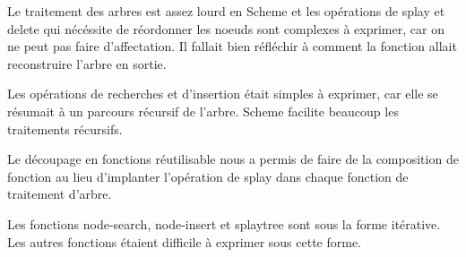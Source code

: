 \documentclass{article}
\begin{document}
  Le traitement des arbres est assez lourd en Scheme et les opérations de splay
  et delete qui nécéssite de réordonner les noeuds sont complexes à exprimer,
  car on ne peut pas faire d'affectation. Il fallait bien réfléchir à comment la
  fonction allait reconstruire l'arbre en sortie.

  Les opérations de recherches et d'insertion était simples à exprimer, car elle
  se résumait à un parcours récursif de l'arbre. Scheme facilite beaucoup les
  traitements récursifs.

  Le découpage en fonctions réutilisable nous a permis de faire de la
  composition de fonction au lieu d'implanter l'opération de splay dans chaque
  fonction de traitement d'arbre.

  Les fonctions \textsf{node-search}, \textsf{node-insert} et \textsf{splaytree}
  sont sous la forme itérative. Les autres fonctions étaient difficile à
  exprimer sous cette forme.
\end{document}
